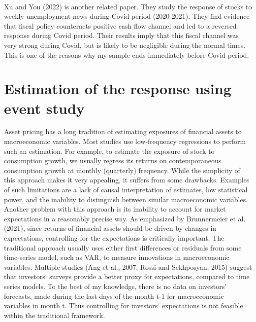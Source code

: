 \documentclass[12pt]{article}
\begin{document}
\paragraph{}
Xu and You (2022) is another related paper. They study the response of stocks to weekly unemployment news during Covid period (2020-2021). They find evidence that fiscal policy counteracts positive cash flow channel and led to a reversed response during Covid period. Their results imply that this fiscal channel was very strong during Covid, but is likely to be negligible during the normal times. This is one of the reasons why my sample ends immediately before Covid period.


\section{Estimation of the response using event study}

Asset pricing has a long tradition of estimating exposures of financial assets to macroeconomic variables. Most studies use low-frequency regressions to perform such an estimation. For example, to estimate the exposure of stock to consumption growth, we usually regress its returns on contemporaneous consumption growth at monthly (quarterly) frequency. While the simplicity of this approach makes it very appealing, it suffers from some drawbacks. Examples of such limitations are a lack of causal interpretation of estimates, low statistical power, and the inability to distinguish between similar macroeconomic variables. Another problem with this approach is its inability to account for market expectations in a reasonably precise way. As emphasized by Brunnermeier et al. (2021), since returns of financial assets should be driven by changes in expectations, controlling for the expectations is critically important. The traditional approach usually uses either first differences or residuals from some time-series model, such as VAR, to measure innovations in macroeconomic variables. Multiple studies (Ang et al., 2007, Rossi and Sekhposyan, 2015) suggest that investors` surveys provide a better proxy for expectations, compared to time series models. To the best of my knowledge, there is no data on investors' forecasts, made during the last days of the month t-1 for macroeconomic variables in month t. Thus controlling for investors` expectations is not feasible within the traditional framework.
\end{document}
